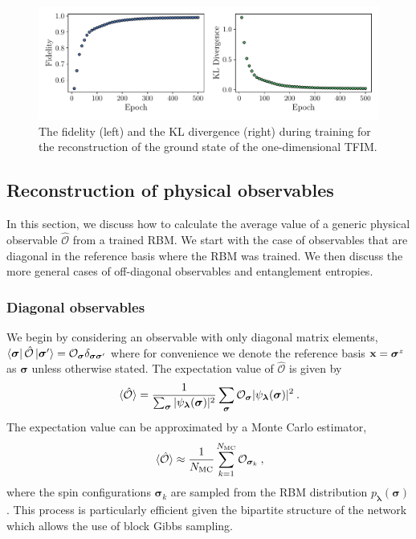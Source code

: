 \documentclass[submission, Phys, hidelnks]{SciPost}
\begin{document}
\begin{figure}[hbt]
    \centering{}
    \includegraphics[width=\columnwidth, trim={0 15 0 0}, clip]{fid_KL.pdf}
    \caption{
        The fidelity (left) and the KL divergence (right) during training for
        the reconstruction of the ground state of the one-dimensional TFIM.\@
    }\label{fig:KL}
\end{figure}

\subsection{Reconstruction of physical observables}\label{Sec:Sampling_a-Trained_RBM}
In this section, we discuss how to calculate the average value of a generic
physical observable $\hat{\mathcal{O}}$ from a trained RBM.\@
We start with the case of observables that are diagonal in the reference basis
where the RBM was trained. We then discuss the more general cases of
off-diagonal observables and entanglement entropies.

\subsubsection{Diagonal observables}
We begin by considering an observable with only diagonal matrix elements,
$\bra{ \bm{\sigma} } \hat{\mathcal{O}} \ket{ \bm{\sigma}^{\prime} }=\mathcal{O}_{\bm{\sigma}}\delta_{\bm{\sigma\sigma}^\prime}$
where for convenience we denote the reference basis ${\bf x}=\bm{\sigma}^z$ as
$\bm{\sigma}$ unless otherwise stated.
The expectation value of $\hat{\mathcal{O}}$ is given by
\begin{equation}
    \ev*{\hat{\mathcal{O}}} = \frac{1}{\sum_{\bm{\sigma}} |\psi_{\bm{\lambda}}(\bm{\sigma})|^2}
    \sum_{\bm{\sigma}} \mathcal{O}_{\bm{\sigma}}|\psi_{\bm{\lambda}}(\bm{\sigma})|^2\:.
\end{equation}
The expectation value can be approximated by a Monte Carlo estimator,
\begin{equation}
    \ev*{\hat{\mathcal{O}}} \approx \frac{1}{N_{\rm MC}} \sum_{k=1}^{N_{\rm MC}} \mathcal{O}_{\bm{\sigma}_k}\:,
\end{equation}
where the spin configurations $\bm{\sigma}_k$ are sampled from the RBM
distribution $p_{\bm{\lambda}}(\bm{\sigma})$. This process is particularly
efficient given the bipartite structure of the network which allows the use
of block Gibbs sampling.
\end{document}
